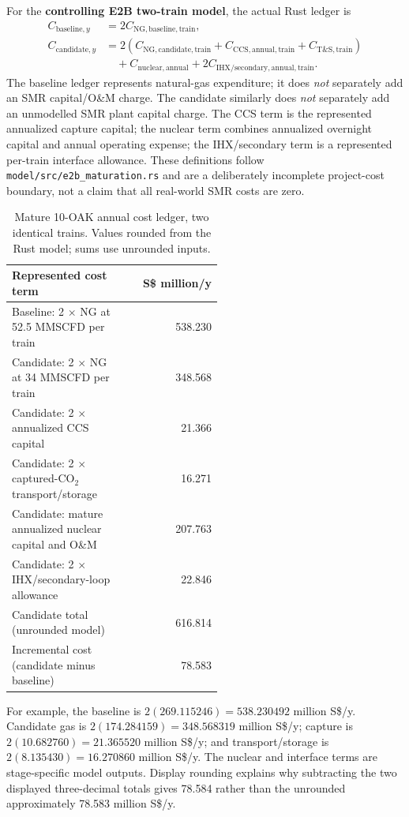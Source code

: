 For the \textbf{controlling E2B two-train model}, the actual Rust ledger is
\begin{align}
C_{\mathrm{baseline},y}&=2C_{\mathrm{NG,baseline,train}},\\
C_{\mathrm{candidate},y}
&=2(C_{\mathrm{NG,candidate,train}}+
 C_{\mathrm{CCS,annual,train}}+
 C_{\mathrm{T\&S,train}})\\
&\quad+C_{\mathrm{nuclear,annual}}+
 2C_{\mathrm{IHX/secondary,annual,train}}.
\end{align}
The baseline ledger represents natural-gas expenditure; it does \emph{not} separately add an SMR capital/O\&M charge. The candidate similarly does \emph{not} separately add an unmodelled SMR plant capital charge. The CCS term is the represented annualized capture capital; the nuclear term combines annualized overnight capital and annual operating expense; the IHX/secondary term is a represented per-train interface allowance. These definitions follow \texttt{model/src/e2b\_maturation.rs} and are a deliberately incomplete project-cost boundary, not a claim that all real-world SMR costs are zero.

\begin{table}[htbp]\centering\small
\caption{Mature 10-OAK annual cost ledger, two identical trains. Values rounded from the Rust model; sums use unrounded inputs.}
\label{tab:teaching-cost-ledger}
\begin{tabular}{p{0.53\linewidth}r}
\toprule
Represented cost term & S\$ million/y\\\midrule
Baseline: 2 $\times$ NG at 52.5 MMSCFD per train & 538.230\\
Candidate: 2 $\times$ NG at 34 MMSCFD per train & 348.568\\
Candidate: 2 $\times$ annualized CCS capital & 21.366\\
Candidate: 2 $\times$ captured-CO$_2$ transport/storage & 16.271\\
Candidate: mature annualized nuclear capital and O\&M & 207.763\\
Candidate: 2 $\times$ IHX/secondary-loop allowance & 22.846\\\midrule
Candidate total (unrounded model) & 616.814\\
Incremental cost (candidate minus baseline) & 78.583\\
\bottomrule
\end{tabular}
\end{table}
\EconomicsDecompositionFigure

For example, the baseline is $2(269.115246)=538.230492$ million S\$/y. Candidate gas is $2(174.284159)=348.568319$ million S\$/y; capture is $2(10.682760)=21.365520$ million S\$/y; and transport/storage is $2(8.135430)=16.270860$ million S\$/y. The nuclear and interface terms are stage-specific model outputs. Display rounding explains why subtracting the two displayed three-decimal totals gives 78.584 rather than the unrounded approximately 78.583 million S\$/y.


